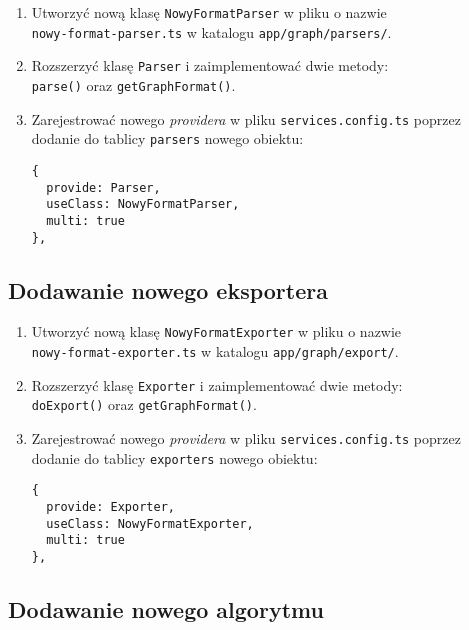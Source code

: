 \begin{enumerate}
\setlength\itemsep{0em}
\item Utworzyć nową klasę \texttt{NowyFormatParser} w pliku o nazwie \\ \texttt{nowy-format-parser.ts} w katalogu \texttt{app/graph/parsers/}.

\item Rozszerzyć klasę \texttt{Parser} i zaimplementować dwie metody: \\ \texttt{parse()} oraz \texttt{getGraphFormat()}.

\item Zarejestrować nowego \textit{providera} w pliku \texttt{services.config.ts} poprzez dodanie do tablicy \texttt{parsers} nowego obiektu:
\begin{verbatim}
{
  provide: Parser, 
  useClass: NowyFormatParser, 
  multi: true
},
\end{verbatim}
\end{enumerate}

\subsection*{Dodawanie nowego eksportera}

\begin{enumerate}
\setlength\itemsep{0em}
\item Utworzyć nową klasę \texttt{NowyFormatExporter} w pliku o nazwie \\ \texttt{nowy-format-exporter.ts} w katalogu \texttt{app/graph/export/}.

\item Rozszerzyć klasę \texttt{Exporter} i zaimplementować dwie metody: \\ \texttt{doExport()} oraz \texttt{getGraphFormat()}.

\item Zarejestrować nowego \textit{providera} w pliku \texttt{services.config.ts} poprzez dodanie do tablicy \texttt{exporters} nowego obiektu:
\begin{verbatim}
{
  provide: Exporter, 
  useClass: NowyFormatExporter, 
  multi: true
},
\end{verbatim}
\end{enumerate}

\subsection*{Dodawanie nowego algorytmu}

